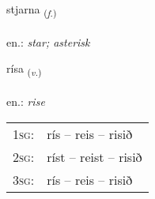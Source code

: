 \documentclass[frontgrid, backgrid]{flacards}\usepackage[]{graphicx}\usepackage[]{xcolor}
\begin{document}
\renewcommand{\flhead}{\vskip5pt \fboxsep=0pt {\small\bfseries\footnotesize Nafnorð | Noun}}
\renewcommand{\fcfoot}{\vskip5pt \fboxsep=0pt \hspace{2pt}{\small\bfseries\footnotesize 2K}}

\renewcommand{\blhead}{\vskip5pt {\small\bfseries\footnotesize Nafnorð | Noun }}
\renewcommand{\bcfoot}{\vskip5pt \hspace{2pt}{\small\bfseries\footnotesize 2K}}


{stjarna \small{\textsubscript{(\textit{f.})}} \\[1ex] %
\textphonetic{[stjartna]} \\
en.: \emph{star; asterisk} \\  [2ex]
\renewcommand*{\arraystretch}{0.8}
}

\renewcommand{\flhead}{\vskip5pt \fboxsep=0pt {\small\bfseries\footnotesize Sagnorð | Verb}}
\renewcommand{\fcfoot}{\vskip5pt \fboxsep=0pt \hspace{2pt}{\small\bfseries\footnotesize 2K}}

\renewcommand{\blhead}{\vskip5pt {\small\bfseries\footnotesize Sagnorð | Verb }}
\renewcommand{\bcfoot}{\vskip5pt \hspace{2pt}{\small\bfseries\footnotesize 2K}}


{rísa \small{\textsubscript{(\textit{v.})}} \\[1ex] %
\textphonetic{[riːsa]} \\
en.: \emph{rise} \\  [2ex]
\renewcommand*{\arraystretch}{0.8}
\begin{tabular}{p{1cm}l}
\textsc{1sg}: & rís -- reis -- risið \\ 
\textsc{2sg}: & ríst -- reist -- risið \\ 
\textsc{3sg}: & rís -- reis -- risið \\ 
\end{tabular}
}
\end{document}
